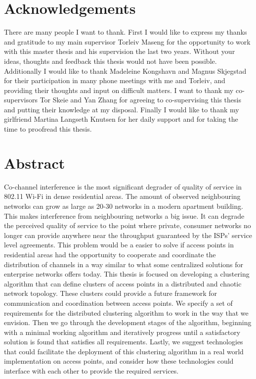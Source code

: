 \chapter*{Acknowledgements}
There are many people I want to thank.\newline
First I would like to express my thanks and gratitude to my main supervisor Torleiv Maseng for the opportunity to work with this master thesis and his supervision the last two years. Without
your ideas, thoughts and feedback this thesis would not have been possible. \newline
Additionally I would like to thank Madeleine Kongshavn and Magnus Skjegstad for their participation in many phone meetings with me and Torleiv, and providing their thoughts and
input on difficult matters. \newline
I want to thank my co-supervisors Tor Skeie and Yan Zhang for agreeing to co-supervising this thesis and putting their knowledge at my disposal. 
\newline
Finally I would like to thank my girlfriend Martina Langseth Knutsen for her daily support and for taking the time to proofread this thesis.




\chapter*{Abstract}
Co-channel interference is the most significant degrader of quality of service in 802.11 Wi-Fi in dense residential areas.
The amount of observed neighbouring networks can grow as large as 20-30 networks in a modern apartment building. This makes
interference from neighbouring networks a big issue. It can degrade the perceived quality of service to the point where private, consumer networks no longer can provide
anywhere near the throughput guaranteed by the ISPs' service level agreements. This problem would be a easier to solve if access points in residential areas had the
opportunity to cooperate and coordinate the distribution of channels in a way similar to what some centralized solutions for enterprise networks offers today.
This thesis is focused on developing a clustering algorithm that can define clusters of access points in a distributed and chaotic network topology. These clusters could 
provide a future framework for communication and coordination between access points.
We specify a set of requirements for the  distributed clustering algorithm to work in the way that we envision. Then we go through the development stages of the algorithm,
beginning with a minimal working algorithm and iteratively progress until a satisfactory solution is found that satisfies all requirements.
Lastly, we suggest technologies that could facilitate the deployment of this clustering algorithm in a real world implementation on access points, and consider
how these technologies could interface with each other to provide the required services.
